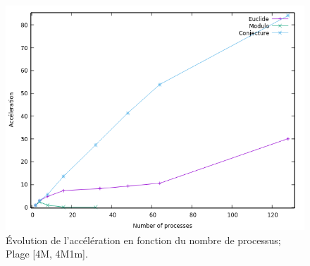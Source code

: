 	\begin{frame}
	\begin{figure}[!ht]	
		\begin{center}\includegraphics[scale=0.55]{Acc_All_4M.png}\end{center}
		\caption{Évolution de l’accélération en fonction du nombre de processus; \\Plage [4M, 4M1m].}
		\label{fg:fig4}
	\end{figure}	
	\end{frame}
	
